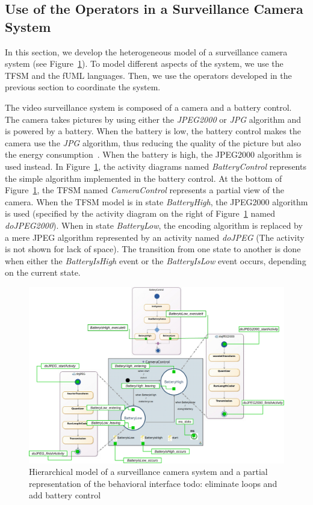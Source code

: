 \subsection{Use of the Operators in a Surveillance Camera System}
	
		
			
			
In this section, we develop the heterogeneous model of a surveillance camera system (see Figure~\ref{fig:camerasystem}). To model different aspects of the system, we use the TFSM and the fUML languages. Then, we use the operators developed in the previous section to coordinate the system.
	
The video surveillance system is composed of a camera and a battery control. The camera takes pictures by using either the \emph{JPEG2000} or \emph{JPG} algorithm and is powered by a battery. When the battery is low, the battery control makes the camera use the \emph{JPG} algorithm, thus reducing the quality of the picture but also the energy consumption~\cite{encodingcomparison}. When the battery is high, the JPEG2000 algorithm is used instead. In Figure~\ref{fig:camerasystem}, the activity diagrams named \emph{BatteryControl} represents the simple algorithm implemented in the battery control. At the bottom of Figure~\ref{fig:camerasystem}, the TFSM named \emph{CameraControl} represents a partial view of the camera. When the TFSM model is in state \emph{BatteryHigh}, the JPEG2000 algorithm is used (specified by the activity diagram on the right of Figure~\ref{fig:camerasystem} named \emph{doJPEG2000}). When in state \emph{BatteryLow}, the encoding algorithm is replaced by a mere JPEG algorithm represented by an activity named \emph{doJPEG} (The activity is not shown for lack of space). The transition from one state to another is done when either the \emph{BatteryIsHigh} event or the \emph{BatteryIsLow} event occurs, depending on the current state.	 
	
	\begin{figure}
		\center
		\includegraphics[width=1\columnwidth]{examples/figs/picmodels.pdf}
		\caption{Hierarchical model of a surveillance camera system and a partial representation of the behavioral interface todo: eliminate loops and add battery control}
		\label{fig:camerasystem}
	\end{figure}
	
